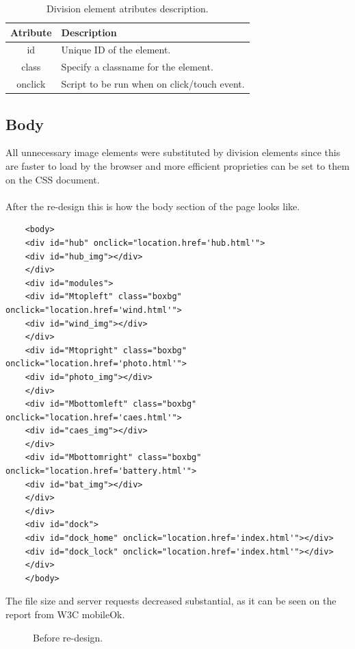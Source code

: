 \begin{table}[h!]
\begin{tabular}{ | c | l | }
\hline
\textbf{Atribute} & \textbf{Description} \\ \hline
id & Unique ID of the element. \\ \hline
class &Specify a classname for the element. \\ \hline
onclick & Script to be run when on click/touch event. \\ \hline
\end{tabular}
\caption{Division element atributes description.}
\end{table}

\subsection{Body}

All unnecessary image elements were substituted by division elements since this are faster to load by the browser and more efficient proprieties can be set to them on the CSS document.\\
\\After the re-design this is how the body section of the page looks like.
\\
\begin{lstlisting}
	<body>
	<div id="hub" onclick="location.href='hub.html'">
	<div id="hub_img"></div>
	</div>
	<div id="modules">
	<div id="Mtopleft" class="boxbg" onclick="location.href='wind.html'">
	<div id="wind_img"></div>
	</div>
	<div id="Mtopright" class="boxbg" onclick="location.href='photo.html'">
	<div id="photo_img"></div>
	</div>
	<div id="Mbottomleft" class="boxbg" onclick="location.href='caes.html'">
	<div id="caes_img"></div>
	</div>
	<div id="Mbottomright" class="boxbg" onclick="location.href='battery.html'">
	<div id="bat_img"></div>
	</div>
	</div>
	<div id="dock">
	<div id="dock_home" onclick="location.href='index.html'"></div>
	<div id="dock_lock" onclick="location.href='index.html'"></div>
	</div>
	</body>
\end{lstlisting}

The file size and server requests decreased substantial, as it can be seen on the report from W3C mobileOk.

\begin{figure}[h!]
	\center
		\setlength\fboxsep{0pt}
		\setlength\fboxrule{1pt}
   	\caption{Before re-design.}
\end{figure}


